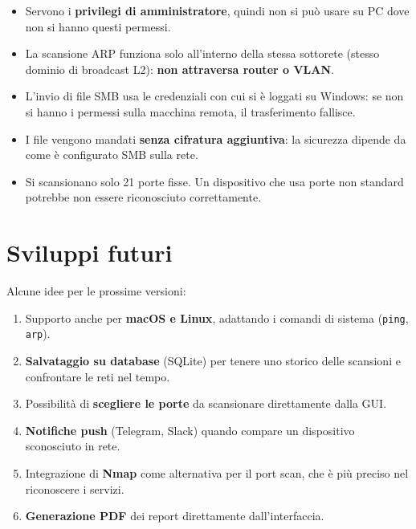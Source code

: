 \documentclass[a4paper,11pt]{article}
\begin{document}
\begin{itemize}[nosep]
  \item Servono i \textbf{privilegi di amministratore}, quindi non
        si può usare su PC dove non si hanno questi permessi.
  \item La scansione ARP funziona solo all'interno della stessa
        sottorete (stesso dominio di broadcast L2): \textbf{non
        attraversa router o VLAN}.
  \item L'invio di file SMB usa le credenziali con cui si è
        loggati su Windows: se non si hanno i permessi sulla
        macchina remota, il trasferimento fallisce.
  \item I file vengono mandati \textbf{senza cifratura aggiuntiva}:
        la sicurezza dipende da come è configurato SMB sulla rete.
  \item Si scansionano solo 21 porte fisse.  Un dispositivo che
        usa porte non standard potrebbe non essere riconosciuto
        correttamente.
\end{itemize}


\section{Sviluppi futuri}

Alcune idee per le prossime versioni:

\begin{enumerate}[nosep]
  \item Supporto anche per \textbf{macOS e Linux}, adattando i
        comandi di sistema (\texttt{ping}, \texttt{arp}).
  \item \textbf{Salvataggio su database} (SQLite) per tenere uno
        storico delle scansioni e confrontare le reti nel tempo.
  \item Possibilità di \textbf{scegliere le porte} da scansionare
        direttamente dalla GUI.
  \item \textbf{Notifiche push} (Telegram, Slack) quando compare
        un dispositivo sconosciuto in rete.
  \item Integrazione di \textbf{Nmap} come alternativa per il
        port scan, che è più preciso nel riconoscere i servizi.
  \item \textbf{Generazione PDF} dei report direttamente
        dall'interfaccia.
\end{enumerate}


\end{document}
